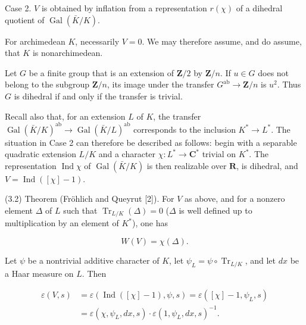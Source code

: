 \documentclass[9pt,twoside]{extarticle}
\begin{document}
{Case 2. \(V\) is obtained by inflation from a representation \(r(\chi)\) of a dihedral quotient of \(\operatorname{Gal}(\bar K/K)\).\par

For archimedean \(K\), necessarily \(V=0\). We may therefore assume, and do assume, that \(K\) is nonarchimedean.\par

Let \(G\) be a finite group that is an extension of \(\mathbf Z/2\) by \(\mathbf Z/n\). If \(u\in G\) does not belong to the subgroup \(\mathbf Z/n\), its image under the transfer \(G^{\mathrm{ab}}\to\mathbf Z/n\) is \(u^2\). Thus \(G\) is dihedral if and only if the transfer is trivial.\par

Recall also that, for an extension \(L\) of \(K\), the transfer \(\operatorname{Gal}(\bar K/K)^{\mathrm{ab}}\to\operatorname{Gal}(\bar K/L)^{\mathrm{ab}}\) corresponds to the inclusion \(K^*\to L^*\). The situation in Case 2 can therefore be described as follows: begin with a separable quadratic extension \(L/K\) and a character \(\chi:L^*\to\mathbf C^*\) trivial on \(K^*\). The representation \(\operatorname{Ind}\chi\) of \(\operatorname{Gal}(\bar K/K)\) is then realizable over \(\mathbf R\), is dihedral, and \(V=\operatorname{Ind}([\chi]-1)\).\par

(3.2) Theorem (Fröhlich and Queyrut [2]). For \(V\) as above, and for a nonzero element \(\Delta\) of \(L\) such that \(\operatorname{Tr}_{L/K}(\Delta)=0\) (\(\Delta\) is well defined up to multiplication by an element of \(K^*\)), one has\par

\[
W(V)=\chi(\Delta).
\]

Let \(\psi\) be a nontrivial additive character of \(K\), let \(\psi_L=\psi\circ\operatorname{Tr}_{L/K}\), and let \(dx\) be a Haar measure on \(L\). Then\par

\[
\begin{aligned}
\varepsilon(V,s)
&=\varepsilon(\operatorname{Ind}([\chi]-1),\psi,s)
 =\varepsilon([\chi]-1,\psi_L,s)\\
&=\varepsilon(\chi,\psi_L,dx,s)\cdot\varepsilon(1,\psi_L,dx,s)^{-1}.
\end{aligned}
\]
}
\end{document}
